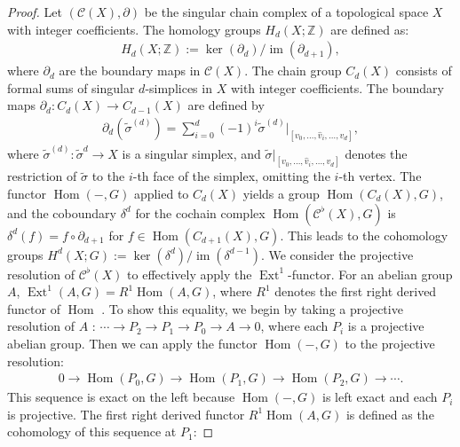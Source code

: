 \begin{proof}
Let $(\mathcal{C}(X),\partial)$ be the singular chain complex of a topological space $X$ with integer coefficients. The homology groups $H_{d}(X; \mathbb{Z})$ are defined as:
\begin{align}
H_{d}(X; \mathbb{Z}) := \ker(\partial_{d}) / \operatorname{im}(\partial_{d+1}),
\end{align}
where $\partial_{d}$ are the boundary maps in $\mathcal{C}(X)$. The chain group $C_{d}(X)$ consists of formal sums of singular $d$-simplices in $X$ with integer coefficients. The boundary maps $\partial_{d}: C_{d}(X) \rightarrow C_{d-1}(X)$ are defined by
\begin{align}
\partial_{d}(\tilde{\sigma}^{(d)}) = \sum_{i=0}^{d}(-1)^{i} \tilde{\sigma}^{(d)}|_{[v_0, \ldots, \hat{v}_i, \ldots, v_d]},
\end{align}
where $\tilde{\sigma}^{(d)}: \tilde{\sigma}^{d} \rightarrow X$ is a singular simplex, and $\tilde{\sigma}|_{[v_0, \ldots, \hat{v}_i, \ldots, v_d]}$ denotes the restriction of $\tilde{\sigma}$ to the $i$-th face of the simplex, omitting the $i$-th vertex. The functor $\operatorname{Hom}(-, G)$ applied to $C_{d}(X)$ yields a group $\operatorname{Hom}(C_{d}(X), G)$, and the coboundary $\delta^{d}$ for the cochain complex $\operatorname{Hom}(\mathcal{C}^\flat(X), G)$ is $\delta^{d}(f) = f \circ \partial_{d+1}$ for $f \in \operatorname{Hom}(C_{d+1}(X), G)$. This leads to the cohomology groups $H^{d}(X; G) := \ker(\delta^{d}) / \operatorname{im}(\delta^{d-1})$. We consider the projective resolution of $\mathcal{C}^\flat(X)$ to effectively apply the $\operatorname{Ext}^1$-functor. For an abelian group $A$, $\operatorname{Ext}^{1}(A, G) = R^{1} \operatorname{Hom}(A, G)$, where $R^{1}$ denotes the first right derived functor of $\operatorname{Hom}$ \cite[Vista 3.4.6, \S 3.5]{Weibel1994}. To show this equality, we begin by taking a projective resolution of $A$ \cite[Definition 2.2.4]{Weibel1994}: $\cdots \to P_{2} \to P_{1} \to P_{0} \to A \to 0$, where each $P_{i}$ is a projective abelian group. Then we can apply the functor $\operatorname{Hom}(-, G)$ to the projective resolution:
\begin{align}
0 \to \operatorname{Hom}(P_{0}, G) \to \operatorname{Hom}(P_{1}, G) \to \operatorname{Hom}(P_{2}, G) \to \cdots.
\end{align}
This sequence is exact on the left because $\operatorname{Hom}(-, G)$ is left exact and each $P_{i}$ is projective. The first right derived functor $R^{1}\operatorname{Hom}(A, G)$ is defined as the cohomology of this sequence at $P_{1}$:

\end{proof}
